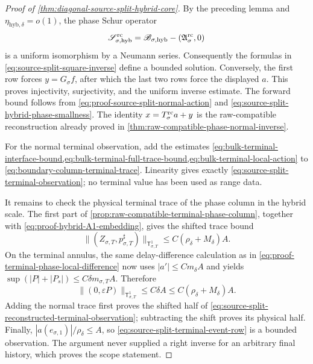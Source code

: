 \begin{proof}[Proof of
\cref{thm:diagonal-source-split-hybrid-core}]
By the preceding lemma and
\(\eta_{\mathrm{hyb},\delta}=o(1)\), the phase Schur operator
\begin{equation*}
 \mathscr S_{\sigma,\mathrm{hyb}}^{\rm rc}
 =\mathscr B_{\sigma,\mathrm{hyb}}
       -(\mathfrak A_\sigma^{\rm rc},0)
\end{equation*}
is a uniform isomorphism by a Neumann series.  Consequently the formulas
in \cref{eq:source-split-square-inverse} define a bounded solution.
Conversely, the first row forces \(y=G_\sigma f\), after which the last
two rows force the displayed \(a\).  This proves injectivity,
surjectivity, and the uniform inverse estimate.  The forward bound follows
from \cref{eq:proof-source-split-normal-action} and
\cref{eq:source-split-hybrid-phase-smallness}.  The identity
\(x=T_\sigma^{\rm rc}a+y\) is the raw-compatible reconstruction already
proved in \cref{thm:raw-compatible-phase-normal-inverse}.

For the normal terminal observation, add the estimates
\cref{eq:bulk-terminal-interface-bound,eq:bulk-terminal-full-trace-bound,eq:bulk-terminal-local-action}
to
\cref{eq:boundary-column-terminal-trace}.  Linearity gives exactly
\cref{eq:source-split-terminal-observation}; no terminal value has been
used as range data.

It remains to check the physical terminal trace of the phase column in the
hybrid scale.  The first part of
\cref{prop:raw-compatible-terminal-phase-column}, together with
\cref{eq:proof-hybrid-A1-embedding}, gives the shifted trace bound
\begin{equation*}
 \|(Z_{\sigma,T},p_{\sigma,T}^{\sharp})\|_{\mathsf T_{\sigma,T}^1}
 \le C(\rho_\delta+M_\delta)A.
\end{equation*}
On the terminal annulus, the same delay-difference calculation as in
\cref{eq:proof-terminal-phase-local-difference} now uses
\(|a'|\le Cm_\delta A\) and yields
\(
 \sup(|P|+|P_s|)\le C\delta m_{\sigma,T}A
\).
Therefore
\begin{equation*}
 \|(0,\varepsilon P)\|_{\mathsf T_{\sigma,T}^1}
 \le C\delta A
 \le C(\rho_\delta+M_\delta)A.
\end{equation*}
Adding the normal trace first proves the shifted half of
\cref{eq:source-split-reconstructed-terminal-observation}; subtracting the
shift proves its physical half.  Finally,
\(|a(e_{\sigma,1})|/\rho_\delta\le A\), so
\cref{eq:source-split-terminal-event-row} is a bounded observation.  The
argument never supplied a right inverse for an arbitrary final history,
which proves the scope statement.
\end{proof}

